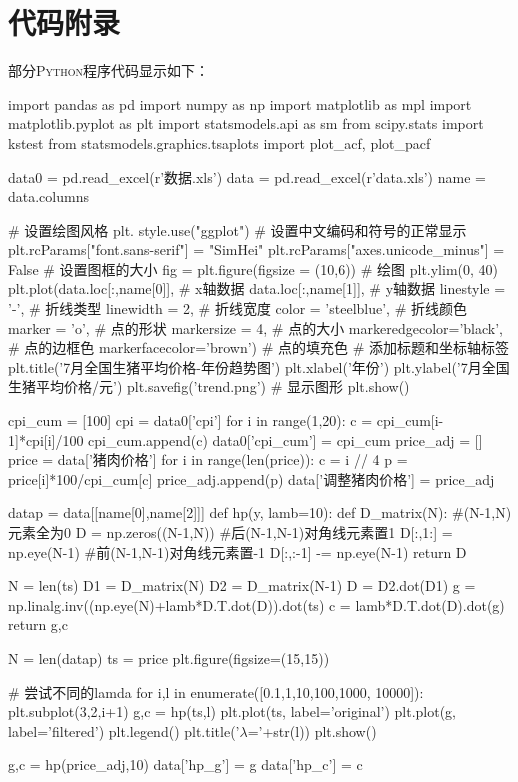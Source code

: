 \documentclass[a4paper,AutoFakeBold,AutoFakeSlant]{ctexart}
\begin{document}
\section*{代码附录}
部分\textsc{Python}程序代码显示如下：
\begin{python}
  import pandas as pd
  import numpy as np
  import matplotlib as mpl
  import matplotlib.pyplot as plt
  import statsmodels.api as sm
  from scipy.stats import kstest
  from statsmodels.graphics.tsaplots import plot_acf, plot_pacf

  data0 = pd.read_excel(r'数据.xls')
  data = pd.read_excel(r'data.xls')
  name = data.columns

  # 设置绘图风格
  plt. style.use("ggplot")
  # 设置中文编码和符号的正常显示
  plt.rcParams["font.sans-serif"] = "SimHei"
  plt.rcParams["axes.unicode_minus"] = False
  # 设置图框的大小
  fig = plt.figure(figsize = (10,6))
  # 绘图
  plt.ylim(0, 40)
  plt.plot(data.loc[:,name[0]], # x轴数据
          data.loc[:,name[1]], # y轴数据
          linestyle = '-', # 折线类型
          linewidth = 2, # 折线宽度
          color = 'steelblue', # 折线颜色
          marker = 'o', # 点的形状
          markersize = 4, # 点的大小
          markeredgecolor='black', # 点的边框色
          markerfacecolor='brown') # 点的填充色
  # 添加标题和坐标轴标签
  plt.title('7月全国生猪平均价格-年份趋势图')
  plt.xlabel('年份')
  plt.ylabel('7月全国生猪平均价格/元')
  plt.savefig('trend.png')
  # 显示图形
  plt.show()
\end{python}

\begin{python}
  cpi_cum = [100]
  cpi = data0['cpi']
  for i in range(1,20):
      c = cpi_cum[i-1]*cpi[i]/100
      cpi_cum.append(c)
  data0['cpi_cum'] = cpi_cum
  price_adj = []
  price = data['猪肉价格']
  for i in range(len(price)):
      c = i // 4
      p = price[i]*100/cpi_cum[c]
      price_adj.append(p)
  data['调整猪肉价格'] = price_adj
\end{python}

\begin{python}
  datap = data[[name[0],name[2]]]
  def hp(y, lamb=10):
    def D_matrix(N):
        #(N-1,N) 元素全为0
        D = np.zeros((N-1,N))
        #后(N-1,N-1)对角线元素置1
        D[:,1:] = np.eye(N-1)
        #前(N-1,N-1)对角线元素置-1
        D[:,:-1] -= np.eye(N-1)
        return D

    N = len(ts)
    D1 = D_matrix(N)
    D2 = D_matrix(N-1)
    D = D2.dot(D1) 
    g = np.linalg.inv((np.eye(N)+lamb*D.T.dot(D)).dot(ts)
    c = lamb*D.T.dot(D).dot(g)
    return g,c

  N = len(datap)
  ts = price
  plt.figure(figsize=(15,15))

  # 尝试不同的lamda
  for i,l in enumerate([0.1,1,10,100,1000, 10000]):
      plt.subplot(3,2,i+1)
      g,c = hp(ts,l)
      plt.plot(ts, label='original')
      plt.plot(g, label='filtered')
      plt.legend()
      plt.title('$\lambda$='+str(l))
  plt.show()

  g,c = hp(price_adj,10)
  data['hp_g'] = g
  data['hp_c'] = c
\end{python}
\end{document}
